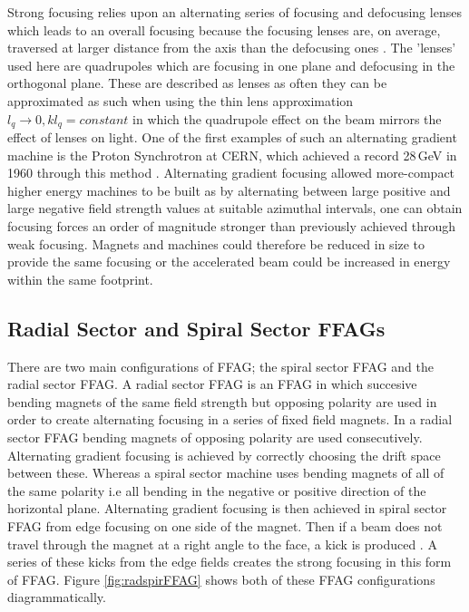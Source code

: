 \documentclass[11pt]{article}
\begin{document}
Strong focusing relies upon an alternating series of focusing and defocusing lenses which leads to an overall focusing because the focusing lenses are, on average, traversed at larger distance from the axis than the defocusing ones \cite{JRossCERNacc}. The 'lenses' used here are quadrupoles which are focusing in one plane and defocusing in the orthogonal plane. These are described as lenses as often they can be approximated as such when using the thin lens approximation $l_{q}\rightarrow 0, kl_{q}=constant$ in which the quadrupole effect on the beam mirrors the effect of lenses on light. One of the first examples of such an alternating gradient machine is the Proton Synchrotron at CERN, which achieved a record 28\,GeV in 1960 through this method \cite{CERNPS}. Alternating gradient focusing allowed more-compact higher energy machines to be built as by alternating between large positive and large negative field strength values at suitable azimuthal intervals,  one can obtain focusing forces an order of magnitude stronger \cite{SnyderTheoryAG} than previously achieved through weak focusing. Magnets and machines could therefore be reduced in size to provide the same focusing or the accelerated beam could be increased in energy within the same footprint.

\subsection{Radial Sector and Spiral Sector FFAGs}

There are two main configurations of FFAG; the spiral sector FFAG and the radial sector FFAG. A radial sector FFAG is an FFAG in which succesive bending magnets of the same field strength but opposing polarity are used in order to create alternating focusing in a series of fixed field magnets. In a radial sector FFAG bending magnets of opposing polarity are used consecutively. Alternating gradient focusing is achieved by correctly choosing the drift space between these. Whereas a spiral sector machine uses bending magnets of all of the same polarity i.e all bending in the negative or positive direction of the horizontal plane. Alternating gradient focusing is then achieved in spiral sector FFAG from edge focusing on one side of the magnet. Then if a beam does not travel through the magnet at a right angle to the face, a kick is produced \cite{SMachidaFFAG}. A series of these kicks from the edge fields creates the strong focusing in this form of FFAG. Figure \ref{fig:radspirFFAG} shows both of these FFAG configurations diagrammatically.  
\end{document}
